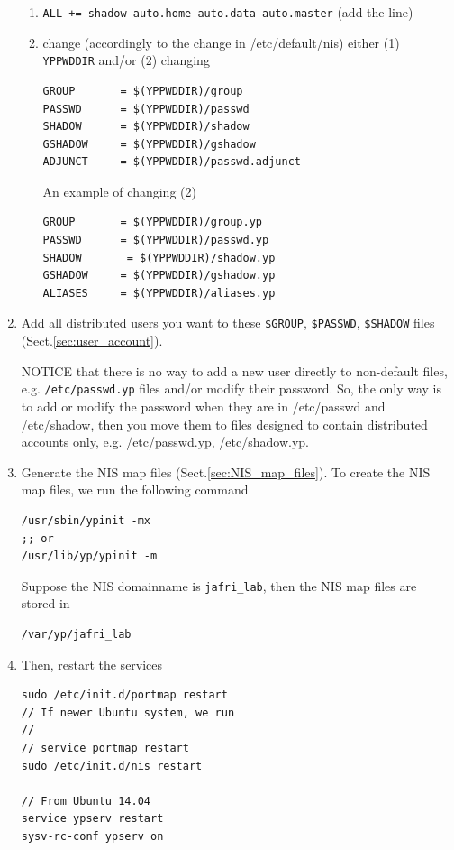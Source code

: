 \begin{enumerate}
\begin{enumerate}
  \item \verb!ALL += shadow auto.home auto.data auto.master! (add the line)
  
  \item change (accordingly to the change in /etc/default/nis) either (1)
  \verb!YPPWDDIR! and/or (2) changing
  \begin{verbatim}
GROUP       = $(YPPWDDIR)/group
PASSWD      = $(YPPWDDIR)/passwd
SHADOW      = $(YPPWDDIR)/shadow
GSHADOW     = $(YPPWDDIR)/gshadow
ADJUNCT     = $(YPPWDDIR)/passwd.adjunct
  \end{verbatim}

An example of changing (2)
\begin{verbatim}
GROUP       = $(YPPWDDIR)/group.yp
PASSWD      = $(YPPWDDIR)/passwd.yp
SHADOW       = $(YPPWDDIR)/shadow.yp
GSHADOW     = $(YPPWDDIR)/gshadow.yp
ALIASES     = $(YPPWDDIR)/aliases.yp
\end{verbatim}
\end{enumerate}

 \item Add all distributed users you want to these \verb!$GROUP!,
 \verb!$PASSWD!, \verb!$SHADOW! files (Sect.\ref{sec:user_account}). 
 
 NOTICE that there is no way to add a new user directly to non-default files,
 e.g.  \verb!/etc/passwd.yp! files and/or modify their password. So, the only
 way is to add or modify the password when they are in /etc/passwd and
 /etc/shadow, then you move them to files designed to contain
distributed accounts only, e.g. /etc/passwd.yp, /etc/shadow.yp.

  
  \item Generate the NIS map files (Sect.\ref{sec:NIS_map_files}). To create the
  NIS map files, we run the following command
\begin{verbatim}
/usr/sbin/ypinit -mx
;; or
/usr/lib/yp/ypinit -m 
\end{verbatim}
Suppose the NIS domainname is \verb!jafri_lab!, then the NIS map files are
stored in
\begin{verbatim}
/var/yp/jafri_lab
\end{verbatim}
  
   \item  Then, restart the services
\begin{verbatim}
sudo /etc/init.d/portmap restart
// If newer Ubuntu system, we run
//
// service portmap restart
sudo /etc/init.d/nis restart

// From Ubuntu 14.04
service ypserv restart
sysv-rc-conf ypserv on
\end{verbatim}


\end{enumerate}
